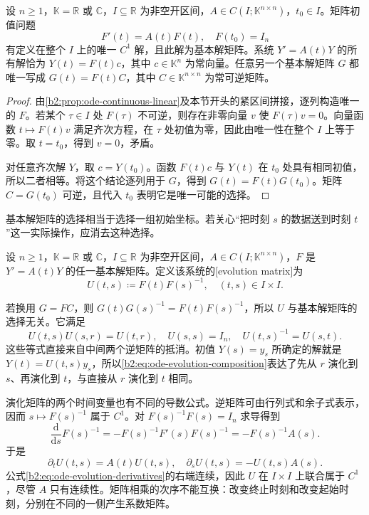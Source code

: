\begin{proposition}\label{b2:prop:ode-fundamental-matrix}
设 \(n\geq1\)，\(\mathbb K=\mathbb R\) 或 \(\mathbb C\)，\(I\subseteq\mathbb R\) 为非空开区间，\(A\in C(I;\mathbb K^{n\times n})\)，\(t_0\in I\)。矩阵初值问题
\[
 F'(t)=A(t)F(t),\quad F(t_0)=I_n
\]
有定义在整个 \(I\) 上的唯一 \(C^1\) 解，且此解为基本解矩阵。系统 \(Y'=A(t)Y\) 的所有解恰为 \(Y(t)=F(t)c\)，其中 \(c\in\mathbb K^n\) 为常向量。任意另一个基本解矩阵 \(G\) 都唯一写成 \(G(t)=F(t)C\)，其中 \(C\in\mathbb K^{n\times n}\) 为常可逆矩阵。
\end{proposition}
\begin{proof}
由\cref{b2:prop:ode-continuous-linear}及本节开头的紧区间拼接，逐列构造唯一的 \(F\)。若某个 \(\tau\in I\) 处 \(F(\tau)\) 不可逆，则存在非零向量 \(v\) 使 \(F(\tau)v=0\)。向量函数 \(t\mapsto F(t)v\) 满足齐次方程，在 \(\tau\) 处初值为零，因此由唯一性在整个 \(I\) 上等于零。取 \(t=t_0\)，得到 \(v=0\)，矛盾。

对任意齐次解 \(Y\)，取 \(c=Y(t_0)\)。函数 \(F(t)c\) 与 \(Y(t)\) 在 \(t_0\) 处具有相同初值，所以二者相等。将这个结论逐列用于 \(G\)，得到 \(G(t)=F(t)G(t_0)\)。矩阵 \(C=G(t_0)\) 可逆，且代入 \(t_0\) 表明它是唯一可能的选择。
\end{proof}

基本解矩阵的选择相当于选择一组初始坐标。若关心“把时刻 \(s\) 的数据送到时刻 \(t\)”这一实际操作，应消去这种选择。

\begin{definition}\label{b2:def:ode-evolution-matrix}
设 \(n\geq1\)，\(\mathbb K=\mathbb R\) 或 \(\mathbb C\)，\(I\subseteq\mathbb R\) 为非空开区间，\(A\in C(I;\mathbb K^{n\times n})\)，\(F\) 是 \(Y'=A(t)Y\) 的任一基本解矩阵。定义该系统的[evolution matrix]为
\[
 U(t,s)\coloneqq F(t)F(s)^{-1},\quad (t,s)\in I\times I.
\]
\end{definition}

若换用 \(G=FC\)，则 \(G(t)G(s)^{-1}=F(t)F(s)^{-1}\)，所以 \(U\) 与基本解矩阵的选择无关。它满足
\begin{equation}\label{b2:eq:ode-evolution-composition}
 U(t,s)U(s,r)=U(t,r),\quad U(s,s)=I_n,
 \quad U(t,s)^{-1}=U(s,t).
\end{equation}
这些等式直接来自中间两个逆矩阵的抵消。初值 \(Y(s)=y_s\) 所确定的解就是 \(Y(t)=U(t,s)y_s\)，所以\eqref{b2:eq:ode-evolution-composition}表达了先从 \(r\) 演化到 \(s\)、再演化到 \(t\)，与直接从 \(r\) 演化到 \(t\) 相同。

\ProseParagraphBreak

演化矩阵的两个时间变量也有不同的导数公式。逆矩阵可由行列式和余子式表示，因而 \(s\mapsto F(s)^{-1}\) 属于 \(C^1\)。对 \(F(s)^{-1}F(s)=I_n\) 求导得到
\[
 \frac{\mathrm d}{\mathrm ds}F(s)^{-1}
 =-F(s)^{-1}F'(s)F(s)^{-1}
 =-F(s)^{-1}A(s).
\]
于是
\begin{equation}\label{b2:eq:ode-evolution-derivatives}
 \partial_tU(t,s)=A(t)U(t,s),\quad
 \partial_sU(t,s)=-U(t,s)A(s).
\end{equation}
公式\eqref{b2:eq:ode-evolution-derivatives}的右端连续，因此 \(U\) 在 \(I\times I\) 上联合属于 \(C^1\)，尽管 \(A\) 只有连续性。矩阵相乘的次序不能互换：改变终止时刻和改变起始时刻，分别在不同的一侧产生系数矩阵。

